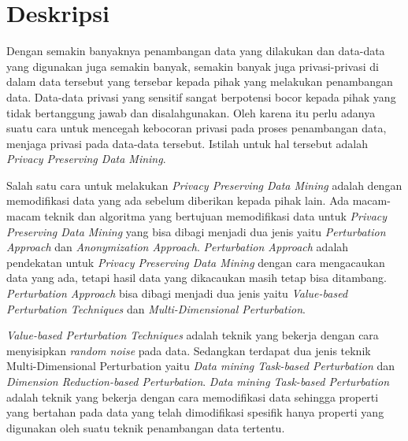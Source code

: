 \documentclass[a4paper,twoside]{article}
\begin{document}
\title{\@judultopik}
\author{\nama \textendash \@npm} 

\newcommand{\nama}{Chris Eldon}
\newcommand{\@npm}{2016730073}
\newcommand{\@judultopik}{Privacy Preserving Data Mining dengan Metode Randomization} %
\newcommand{\jumpemb}{1} %
\newcommand{\tanggal}{27/08/2019}


\maketitle


\section{Deskripsi}
Dengan semakin banyaknya penambangan data yang dilakukan dan data-data yang digunakan juga semakin banyak, semakin banyak juga privasi-privasi di dalam data tersebut yang tersebar kepada pihak yang melakukan penambangan data. Data-data privasi yang sensitif sangat berpotensi bocor kepada pihak yang tidak bertanggung jawab dan disalahgunakan. Oleh karena itu perlu adanya suatu cara untuk mencegah kebocoran privasi pada proses penambangan data, menjaga privasi pada data-data tersebut. Istilah untuk hal tersebut adalah \textit{Privacy Preserving Data Mining}.

Salah satu cara untuk melakukan \textit{Privacy Preserving Data Mining} adalah dengan memodifikasi data yang ada sebelum diberikan kepada pihak lain. Ada macam-macam teknik dan algoritma yang bertujuan memodifikasi data untuk \textit{Privacy Preserving Data Mining} yang bisa dibagi menjadi dua jenis yaitu \textit{Perturbation Approach} dan \textit{Anonymization Approach}. \textit{Perturbation Approach} adalah pendekatan untuk \textit{Privacy Preserving Data Mining} dengan cara mengacaukan data yang ada, tetapi hasil data yang dikacaukan masih tetap bisa ditambang. \textit{Perturbation Approach} bisa dibagi menjadi dua jenis yaitu \textit{Value-based Perturbation Techniques} dan \textit{Multi-Dimensional Perturbation}.

\textit{Value-based Perturbation Techniques} adalah teknik yang bekerja dengan cara menyisipkan \textit{random noise} pada data. Sedangkan terdapat dua jenis teknik {Multi-Dimensional Perturbation} yaitu \textit{Data mining Task-based Perturbation} dan \textit{Dimension Reduction-based Perturbation}. \textit{Data mining Task-based Perturbation} adalah teknik yang bekerja dengan cara memodifikasi data sehingga properti yang bertahan pada data yang telah dimodifikasi spesifik hanya properti yang digunakan oleh suatu teknik penambangan data tertentu.
\end{document}
